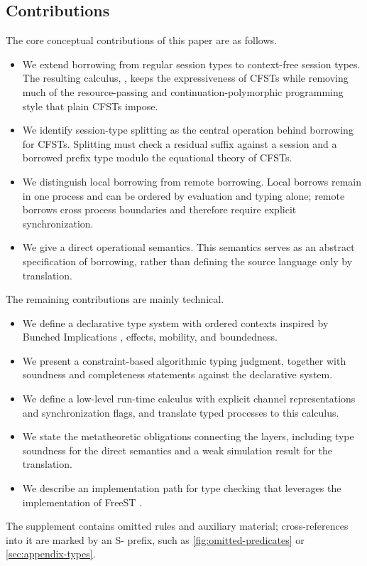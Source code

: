 \subsection*{Contributions}

The core conceptual contributions of this paper are as follows.
\begin{itemize}
\item We extend borrowing from regular session types to context-free
  session types. The resulting calculus, \thecalculus, keeps the
  expressiveness of CFSTs while removing much of the
  resource-passing and continuation-polymorphic programming style that
  plain CFSTs impose.
\item We identify session-type splitting as the central operation
  behind borrowing for CFSTs. Splitting must check a residual suffix
  against a session and a borrowed prefix type modulo the equational
  theory of CFSTs.
\item We distinguish local borrowing from remote borrowing. Local
  borrows remain in one process and can be ordered by evaluation and
  typing alone; remote borrows cross process boundaries and therefore
  require explicit synchronization.
\item We give \thecalculus a direct operational semantics. This
  semantics serves as an abstract specification of borrowing, rather
  than defining the source language only by translation.
\end{itemize}

The remaining contributions are mainly technical.
\begin{itemize}
\item We define a declarative type system with ordered contexts inspired by
  Bunched Implications \cite{DBLP:journals/bsl/OHearnP99}, effects, mobility, and
  boundedness.
\item We present a constraint-based algorithmic typing judgment, together with
  soundness and completeness statements against the declarative system.
\item We define a low-level run-time calculus with explicit channel
  representations and synchronization flags, and translate typed
  \thecalculus processes to this calculus.
\item We state the metatheoretic obligations connecting the layers,
  including type soundness for the direct semantics and a weak simulation
  result for the translation.
\item We describe an implementation path for type checking that
  leverages the implementation of FreeST
  \cite{almeida26:_frees_concur_progr_languag_with,DBLP:journals/corr/abs-1904-01284}.
\end{itemize}

The supplement contains omitted rules and auxiliary material;
cross-references into it are marked by an \textup{S-} prefix, such as
\cref{fig:omitted-predicates} or \cref{sec:appendix-types}.

